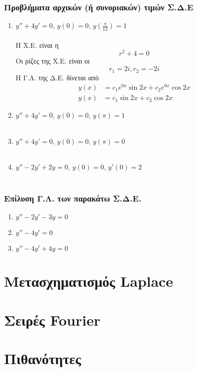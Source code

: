 \documentclass[]{book}
\begin{document}
\begin{multicols*}{2}
\subsection{Προβλήματα αρχικών (ή συνοριακών) τιμών Σ.Δ.Ε}
\begin{enumerate}
    \item $ y'' + 4y' = 0 \text{, } y(0) = 0 \text{, } y(\frac{\pi}{12}) = 1 $ \\\\
    Η Χ.Ε. είναι η $$ r^2 + 4 = 0 $$
    Οι ρίζες της Χ.Ε. είναι οι $$ r_1 = 2i, r_2 = -2i $$
    Η Γ.Λ. της Δ.Ε. δίνεται από
    \begin{equation*}
        \begin{aligned}
            y(x) & = c_1 e^{0x} \sin{2x} + c_2 e^{0x} \cos{2x} \\
            y(x) & = c_1 \sin{2x} + c_2 \cos{2x}
        \end{aligned}
    \end{equation*}
    \item $ y'' + 4y' = 0 \text{, } y(0) = 0 \text{, } y(\pi) = 1 $ \\\\
    \item $ y'' + 4y' = 0 \text{, } y(0) = 0 \text{, } y(\pi) = 0 $ \\\\
    \item $ y'' - 2y' + 2y = 0 \text{, } y(0) = 0 \text{, } y'(0) = 2 $ \\\\
\end{enumerate}
\subsection{Επίλυση Γ.Λ. των παρακάτω Σ.Δ.Ε.}
\begin{enumerate}
    \item $ y'' - 2y' - 3y = 0 $
    \item $ y'' - 4y' = 0 $
    \item $ y'' - 4y' + 4y = 0 $
\end{enumerate}
\end{multicols*}
\chapter{Μετασχηματισμός Laplace}
\chapter{Σειρές Fourier}
\chapter{Πιθανότητες}
\end{document}
